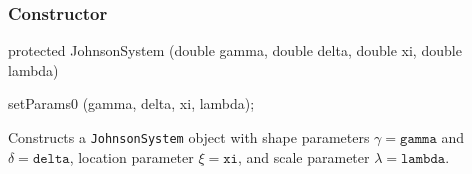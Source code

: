 \subsubsection* {Constructor}

\begin{code}

   protected JohnsonSystem (double gamma, double delta, double xi,
                            double lambda)\begin{hide} {
      setParams0 (gamma, delta, xi, lambda);
   }\end{hide}
\end{code}
  \begin{tabb} Constructs a \texttt{JohnsonSystem} object
   with shape parameters $\gamma = \texttt{gamma}$ and $\delta = \texttt{delta}$,
   location parameter $\xi = \texttt{xi}$, and scale parameter
   $\lambda = \texttt{lambda}$.
  \end{tabb}

